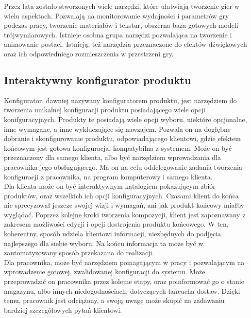 \documentclass{article} %
\begin{document}
        Przez lata zostało stworzonych wiele narzędzi, które ułatwiają tworzenie gier w wielu aspektach. Pozwalają na monitorowanie wydajności i parametrów gry podczas pracy, tworzenie materiałów i tekstur, obszerna baza gotowych modeli trójwymiarowych. Istnieje osobna grupa narzędzi pozwalająca na tworzenie i animowanie postaci. Istnieją, też narzędzia przeznaczone do efektów dźwiękowych oraz ich odpowiedniego rozmieszczenia w przestrzeni gry.
        \\
        
        
        
    \subsection{Interaktywny konfigurator produktu}
        Konfigurator, dawniej nazywany konfiguratorem produktu, jest narzędziem do tworzenia unikalnej konfiguracji produktu posiadającego wiele opcji konifguracyjnych. Produkty te posiadają wiele opcji wyboru, niektóre opcjonalne, inne wymagane, a inne wykluczające się nawzajem. Pozwala on na dogłębne dobranie i skonfigurowanie produktu, odpowiadającego klientowi, gdzie efektem końcowym jest gotowa konfiguracja, kompatybilna z systemem. Może on być przeznaczony dla samego klienta, albo być narzędziem wprowadzania dla pracownika jego obsługującego. Ma on na celu oddelegowanie zadania tworzenia konfiguracji z pracownika, na program komputerowy i samego klienta. \cite{oracle}
        \\
        
        Dla klienta może on być interaktywnym katalogiem pokazującym zbiór produktów, oraz wszelkich ich opcji konfiguracyjnych. Czasami klient do końca nie sprecyzował jeszcze swojej wizji i wymagań, ani jak produkt końcowy miałby wyglądać. Poprzez kolejne kroki tworzenia kompozycji, klient jest zapoznawany z zakresem możliwości edycji i opcji dostrojenia produktu końcowego. W ten, koherentny, sposób udziela klientowi informacji, niezbędnych do podjęcia najlepszego dla siebie wyboru. Na końcu informacja ta może być w zautomatyzowany sposób przekazana do realizacji.
        \\
        
        Dla pracownika, może być narzędziem pomagającym w pracy i pozwalającym na wprowadzenie gotowej, zwalidowanej konfiguracji do systemu. Może przeprowadzić on pracownika przez kolejne etapy, oraz poinformować go o stanie magazynu, albo innych niedogodnościach, dotyczących łańcucha dostaw. Dzięki temu, pracownik jest odciążony, a swoją uwagę może skupić na zadawaniu bardziej szczegółowych pytań klientowi.
        
\end{document}
